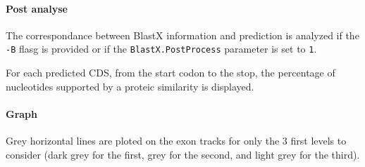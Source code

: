 \paragraph{Post analyse}

The correspondance between BlastX information and prediction is
analyzed if the \texttt{-B} flasg  is provided or if the
\texttt{BlastX.PostProcess} parameter is set to \texttt{1}.

For each predicted CDS, from the start codon to the stop, the
percentage of nucleotides supported by a proteic similarity is
displayed.

\paragraph{Graph}

Grey horizontal lines are ploted on the exon tracks for only the 3
first levels to consider (dark grey for the first, grey for the
second, and light grey for the third).

